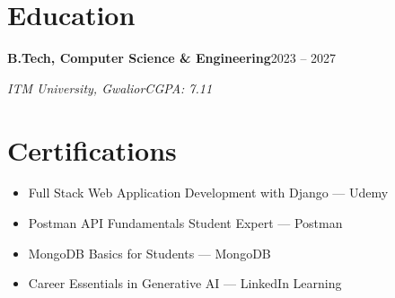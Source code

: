 \documentclass[a4paper,10pt]{article}
\newcommand{\entry}[4]{%
  \vspace{3pt}%
  \textbf{#1}\hfill #2\par
  \vspace{1pt}%
  \textit{#3}\hfill \textit{#4}\par
  \vspace{2pt}%
}
\begin{document}
\section{Education}
\entry{B.Tech, Computer Science \& Engineering}{2023 -- 2027}{ITM University, Gwalior}{CGPA: 7.11}

\section{Certifications}
\begin{itemize}
  \item Full Stack Web Application Development with Django --- Udemy
  \item Postman API Fundamentals Student Expert --- Postman
  \item MongoDB Basics for Students --- MongoDB
  \item Career Essentials in Generative AI --- LinkedIn Learning
\end{itemize}
\end{document}
